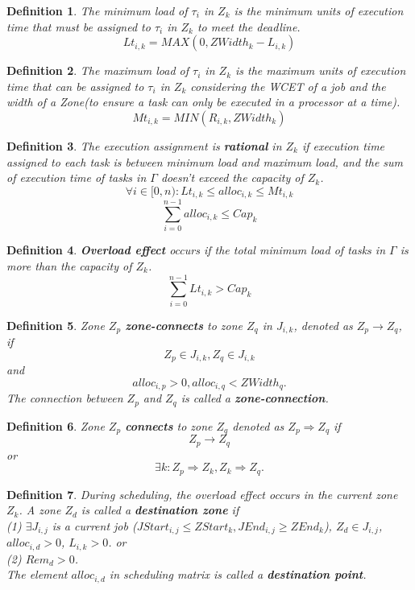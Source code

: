 \documentclass{article}
\begin{document}
\newtheorem{defi}{Definition}
\newtheorem{lemm}{Lemma}

\begin{defi}
The minimum load of $\tau_i$ in $Z_k$ is the minimum units of execution time that must be assigned to $\tau_i$ in $Z_k$ to meet the deadline.
\[
	Lt_{i,k}=MAX(0,ZWidth_k-L_{i,k})
\]
\end{defi}

\begin{defi}
The maximum load of $\tau_i$ in $Z_k$ is the maximum units of execution time that can be assigned to $\tau_i$ in $Z_k$ considering the WCET of a job and the width of a Zone(to ensure a task can only be executed in a processor at a time).
\[
	Mt_{i,k}=MIN(R_{i,k}, ZWidth_k)
\]
\end{defi}

\begin{defi}
The execution assignment is \textbf{rational} in $Z_k$ if execution time assigned to each task is between minimum load and maximum load, and the sum of execution time of tasks in $\Gamma$ doesn't exceed the capacity of $Z_k$.
\[
	\forall i \in [0,n) : Lt_{i,k} \leq alloc_{i,k} \leq Mt_{i,k}
\]
\[
	\sum\limits_{i=0}^{n-1}alloc_{i,k} \leq Cap_k
\]
\end{defi}

\begin{defi}
\textbf{Overload effect} occurs if the total minimum load of tasks in $\Gamma$ is more than the capacity of $Z_k$.
\[
	\sum\limits_{i=0}^{n-1}Lt_{i,k} > Cap_k
\]
\end{defi}

\begin{defi}
Zone $Z_p$ \textbf{zone-connects} to zone $Z_q$ in $J_{i,k}$, denoted as $Z_p \to Z_q$, if
\[
	Z_p \in J_{i,k}, Z_q \in J_{i,k}
\]
and
\[
	alloc_{i,p}>0, alloc_{i,q}<ZWidth_q.
\]
The connection between $Z_p$ and $Z_q$ is called a \textbf{zone-connection}.
\end{defi}

\begin{defi}
	Zone $Z_p$ \textbf{connects} to zone $Z_q$ denoted as $Z_p \Rightarrow Z_q$ if
	\[
		Z_p \to Z_q
	\]
	or
	\[
		\exists k : Z_p \Rightarrow Z_k, Z_k \Rightarrow Z_q.
	\]
\end{defi}

\begin{defi}
	During scheduling, the overload effect occurs in the current zone $Z_k$. A zone $Z_d$ is called a \textbf{destination zone} if \\
	(1) $\exists J_{i,j}$ is a current job ($JStart_{i,j} \leq ZStart_k, JEnd_{i,j} \geq ZEnd_k$), $Z_d \in J_{i,j}$, $alloc_{i,d}>0$, $L_{i,k}>0$. or \\
	(2) $Rem_d > 0$. \\
	The element $alloc_{i,d}$ in scheduling matrix is called a \textbf{destination point}.
\end{defi}
\end{document}
